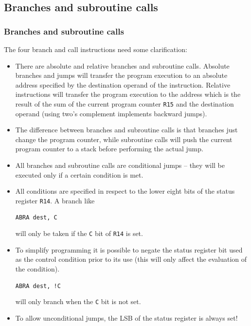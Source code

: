 \documentclass{beamer}
\begin{document}
  \subsection{Branches and subroutine calls}
   \begin{frame}
    \frametitle{Branches and subroutine calls}
    The four branch and call instructions need some clarification:
    \begin{itemize}
     \item There are absolute and relative branches and subroutine calls.
      Absolute branches and jumps will transfer the program execution to
      an absolute address specified by the destination operand of the 
      instruction.
      Relative instructions will transfer the program execution to the
      address which is the result of the sum of the current program counter
      {\tt R15} and the destination operand (using two's complement 
      implements backward jumps).
     \item The difference between branches and subroutine calls is that
      branches just change the program counter, while subroutine calls
      will push the current program counter to a stack before performing
      the actual jump. 
    \end{itemize}
   \end{frame}
%
   \begin{frame}
    \begin{itemize}
     \item All branches and subroutine calls are conditional jumps -- they 
      will be executed only if a certain condition is met. 
     \item All conditions are specified in respect to the lower eight bits
      of the status register {\tt R14}. A branch like\\
      \begin{center}
       {\tt ABRA dest, C}
      \end{center}
      will only be taken if the {\tt C} bit of {\tt R14} is set.
     \item To simplify programming it is possible to negate the status
      register bit used as the control condition prior to its use (this 
      will only affect the evaluation of the condition).
      \begin{center}
       {\tt ABRA dest, !C}
      \end{center}
      will only branch when the {\tt C} bit is not set.
     \item To allow unconditional jumps, the LSB of the status register
      is always set!
    \end{itemize}
   \end{frame}
%
\end{document}
